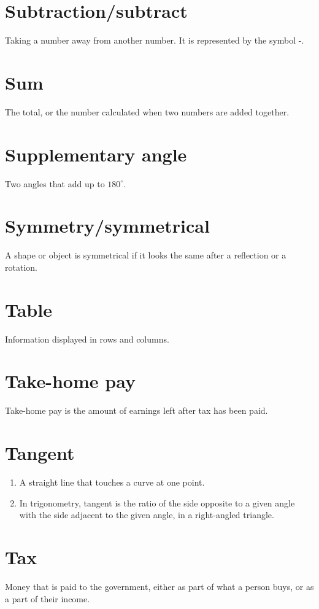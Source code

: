 \documentclass[10pt]{article}
\begin{document}
\section*{Subtraction/subtract}
Taking a number away from another number. It is represented by the symbol -.

\section*{Sum}
The total, or the number calculated when two numbers are added together.

\section*{Supplementary angle}
Two angles that add up to $180^{\circ}$.

\section*{Symmetry/symmetrical}
A shape or object is symmetrical if it looks the same after a reflection or a rotation.

\section*{Table}
Information displayed in rows and columns.

\section*{Take-home pay}
Take-home pay is the amount of earnings left after tax has been paid.

\section*{Tangent}
\begin{enumerate}
  \item A straight line that touches a curve at one point.
  \item In trigonometry, tangent is the ratio of the side opposite to a given angle with the side adjacent to the given angle, in a right-angled triangle.
\end{enumerate}

\section*{Tax}
Money that is paid to the government, either as part of what a person buys, or as a part of their income.
\end{document}
